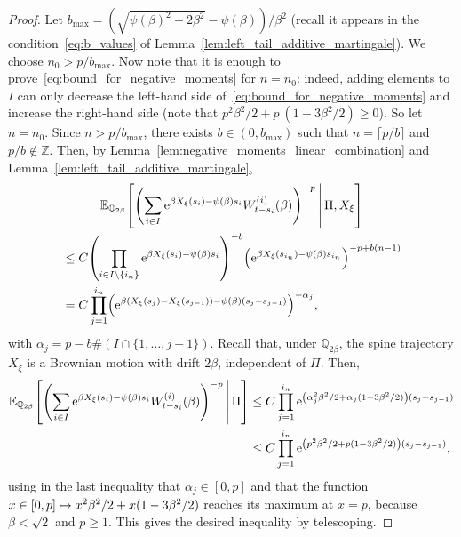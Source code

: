 \documentclass[AHL,Unicode,longabstracts,published]{cedram}
\newcommand{\e}{\mathrm{e}}
\newcommand{\E}{\mathbb{E}}
\newcommand{\Q}{\mathbb{Q}}
\newcommand{\Z}{\mathbb{Z}}
\newcommand\1{\mathds{1}}
\let\originalleft\left
\let\originalright\right
\renewcommand{\left}{\mathopen{}\mathclose\bgroup\originalleft}
\renewcommand{\right}{\aftergroup\egroup\originalright}
\let\oldmapsto\mapsto
\renewcommand*{\mapsto}{\mathchoice{\longmapsto}{\oldmapsto}{\oldmapsto}{\oldmapsto}}
\begin{document}
\begin{proof}
Let $b_{\max} = (\sqrt{\psi(\beta)^2 + 2\beta^2} - \psi(\beta))/\beta^2$ (recall it appears in the condition~\eqref{eq:b_values} of Lemma~\ref{lem:left_tail_additive_martingale}). We choose $n_0 > p/b_{\max}$. Now note that it is enough to prove~\eqref{eq:bound_for_negative_moments} for $n=n_0$: indeed, adding elements to $I$ can only decrease the left-hand side of~\eqref{eq:bound_for_negative_moments} and increase the right-hand side (note that $p^2\beta^2/2 + p~(1 - 3\beta^2/2) \geq 0$). So let $n = n_0$. Since $n > p/b_{\max}$, there exists $b \in (0,b_{\max})$ such that $n = \lceil p/b \rceil$ and $p/b \notin \Z$. Then, by Lemma~\ref{lem:negative_moments_linear_combination} and Lemma~\ref{lem:left_tail_additive_martingale},
\begin{multline*}
\E_{\Q_{2\beta}} \left[\left(\sum_{i \in I} \e^{\beta X_\xi(s_i) - \psi(\beta)s_i} W_{t - s_i}^{(i)}(\beta) \right)^{-p} \,\middle|\, \Pi, X_\xi \right]  \\
\begin{aligned}
&\leq C \left(\prod_{i \in I \setminus \{i_n\}} \e^{\beta X_\xi(s_i) - \psi(\beta)s_i} \right)^{-b} \left(\e^{\beta X_\xi(s_{i_n}) - \psi(\beta)s_{i_n}} \right)^{-p + b(n-1)}  \\
& = C \prod_{j = 1}^{i_n} \left(\e^{\beta \left(X_\xi(s_j) - X_\xi(s_{j-1})\right) - \psi(\beta)\left(s_j - s_{j-1}\right)} \right)^{-\alpha_j},
\end{aligned}
\end{multline*}
with $\alpha_j = p - b \#(I \cap \{1, \dots, j-1\})$. Recall that, under $\Q_{2\beta}$, the spine trajectory $X_\xi$ is a Brownian motion with drift $2\beta$, independent of $\Pi$. Then,
\begin{align*}
\E_{\Q_{2\beta}} \left[\left(\sum_{i \in I} \e^{\beta X_\xi(s_i) - \psi(\beta)s_i} W_{t - s_i}^{(i)}(\beta) \right)^{-p} \,\middle|\, \Pi \right] &\leq C \prod_{j = 1}^{i_n} \e^{\left(\alpha_j^2 \beta^2/2 + \alpha_j (1 - 3\beta^2/2)\right)\left(s_j - s_{j - 1}\right)}\\
&\leq C \prod_{j = 1}^{i_n} \e^{\left(p^2 \beta^2/2 + p (1 - 3\beta^2/2)\right)\left(s_j - s_{j - 1}\right)},
\end{align*}
using in the last inequality that $\alpha_j \in [0,p]$ and that the function $x \in [0,p] \mapsto x^2 \beta^2/2 + x (1 - 3\beta^2/2)$ reaches its maximum at $x=p$, because $\beta <\sqrt{2}$ and $p\geq 1$. This gives the desired inequality by telescoping.
\end{proof}
\end{document}
